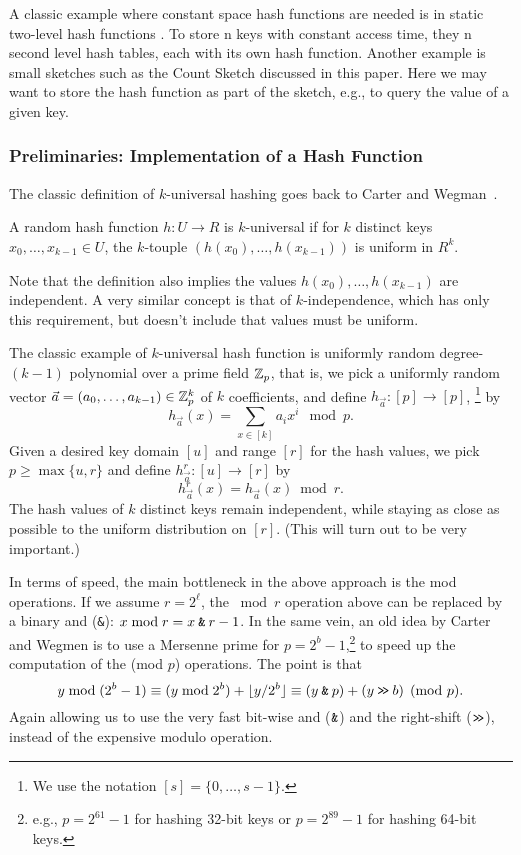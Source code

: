 A classic example where constant space hash functions are needed is in
static two-level hash functions \cite{FKS84}.  To store n keys with
constant access time, they n second level hash tables, each with its
own hash function.  Another example is small sketches such as the
Count Sketch \cite{charikar04count-sketch} discussed in this
paper. Here we may want to store the hash function as part of the
sketch, e.g., to query the value of a given key.


\subsubsection{Preliminaries: Implementation of a Hash Function}
The classic definition of $k$-universal hashing
goes back to Carter and Wegman~\cite{wegman81kwise}.
\begin{definition}
   A random hash function $h:U\to R$ is $k$-universal if for $k$
   distinct keys $x_0,\ldots,x_{k-1}\in U$, the $k$-touple
   $(h(x_0),\ldots,h(x_{k-1}))$ is uniform in $R^k$.
\end{definition}
\noindent
Note that the definition also implies the values 
$h(x_0),\ldots,h(x_{k-1})$ are independent.
A very similar concept is that of $k$-independence, which has only this requirement, but doesn't include that values must be uniform.

The classic example of $k$-universal
hash function is uniformly random degree-$(k-1)$ polynomial over a prime field
$\mathbb Z_p$, that is, we pick a uniformly random vector
$\vec a=(a_0,\ldots,a_{k-1})\in \mathbb Z_p^k$ of $k$ coefficients, and define
$h_{\vec a}:[p]\to[p]$,
\footnote{ We use the notation $[s]=\{0,\ldots,s-1\}$.  }
   by 
\[h_{\vec a}(x)=\sum_{x\in[k]}a_i x^i \mod p.\]
%
Given a desired key domain $[u]$ and range $[r]$ for the hash values, we pick
$p\geq \max\{u,r\}$ and define
$h^r_{\vec a}:[u]\to[r]$ by
\[h^r_{\vec a}(x)=h_{\vec a}(x)\bmod r.\]
The  hash values of $k$ distinct keys remain independent,
while staying as close as possible to the uniform distribution on $[r]$.
(This will turn out to be very important.)

In terms of speed, the main bottleneck in the above approach is the mod operations.
If we assume $r=2^\ell$, the $\bmod r$ operation above can be replaced by a binary {\sc and} (\texttt{\&}): $x \bmod r = x \mathbin{\texttt{\&}} r-1$.
In the same vein, an old idea by 
Carter and Wegmen \cite{carter77universal} is to use a
Mersenne prime for $p=2^b-1$,\footnote{e.g., $p=2^{61}-1$ for hashing 32-bit keys or
$p=2^{89}-1$ for hashing 64-bit keys.}
to speed up the computation of the (mod $p$) operations.
The point is that
\begin{equation}
   y \bmod (2^b-1)
   \equiv (y\bmod 2^{b}) + \lfloor {y/2^b} \rfloor
   \equiv (y \mathbin{\texttt{\&}} p) + (y \mathbin{\texttt{>\!>}} b)
   \pmod {p}.
   \label{eq:Mersenne}
\end{equation}
Again allowing us to use the very fast bit-wise {\sc and} ($\mathbin{\texttt{\&}}$) and the right-shift ($\mathbin{\texttt{>\!>}}$),
instead of the expensive modulo operation.


